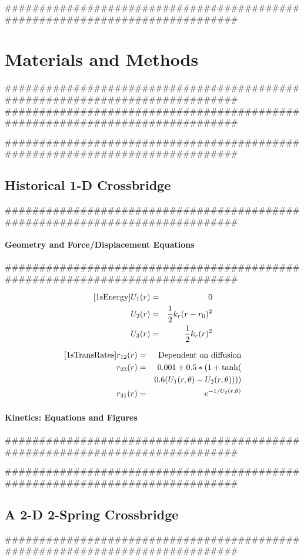 \documentclass[11pt]{article}
\begin{document}
\begin{multicols}{2}
#############################################################################
\section*{Materials and Methods}
#############################################################################
#############################################################################

#############################################################################
\subsection*{Historical 1-D Crossbridge}
#############################################################################


\paragraph*{Geometry and Force/Displacement Equations}
#############################################################################

\begin{eqnarray}
\ref{1sEnergy}
    U_1(r) & = & 0 \nonumber \\
    U_2(r) & = & \frac{1}{2}k_r (r-r_0)^2 \nonumber \\
    U_3(r) & = & \frac{1}{2}k_r (r)^2 \\
\end{eqnarray}

\begin{eqnarray}  
\ref{1sTransRates}
	r_{12}(r)   & = & \text{Dependent on diffusion} \nonumber \\
    r_{23}(r)   & = & 0.001 + 0.5 * (1 + \tanh( \nonumber \\
                        &   & 0.6 (U_1(r, \theta) - U_2(r, \theta)))) \\
	r_{31}(r)   & = & e^{-1 / U_2(r, \theta)}
\end{eqnarray} 
 
\paragraph*{Kinetics: Equations and Figures}
#############################################################################


#############################################################################
\subsection*{A 2-D 2-Spring Crossbridge}
#############################################################################



\end{multicols}
\end{document}
